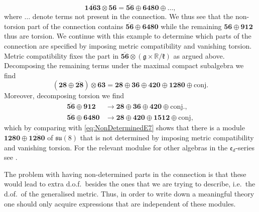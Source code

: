 \begin{equation}
    \overbar{\mathbf{1463}}\otimes\mathbf{56} = \overbar{\mathbf{56}}\oplus\mathbf{6480}\oplus\ldots,
\end{equation}
where $\ldots$ denote terms not present in the connection. We thus see that the non-torsion part of the connection contains $\overbar{\mathbf{56}}\oplus \mathbf{6480}$ while the remaining $\mathbf{56}\oplus\mathbf{912}$ thus are torsion. We continue with this example to determine which parts of the connection are specified by imposing metric compatibility and vanishing torsion. Metric compatibility fixes the part in $\overbar{\mathbf{56}}\otimes(\mathfrak{g}\times\mathbb{R}/\mathfrak{k})$ as argued above. Decomposing the remaining terms under the maximal compact subalgebra we find 
\begin{equation}\label{eq:NonDeterminedE7}
    \left(\mathbf{28}\oplus\overbar{\mathbf{28}}\right)\otimes\mathbf{63} = \mathbf{28}\oplus\mathbf{36}\oplus\mathbf{420}\oplus\mathbf{1280}\oplus \text{conj.}
\end{equation}
Moreover, decomposing torsion we find  
\begin{equation}
    \begin{aligned}
        \overbar{\mathbf{56}}\oplus\mathbf{912}&\to \mathbf{28}\oplus\mathbf{36}\oplus\mathbf{420}\oplus\text{conj.},\\
        \overbar{\mathbf{56}}\oplus\mathbf{6480}&\to\mathbf{28}\oplus\mathbf{420}\oplus\mathbf{1512}\oplus\text{conj},
    \end{aligned}
\end{equation}
which by comparing with \eqref{eq:NonDeterminedE7} shows that there is a module $\mathbf{1280}\oplus\overbar{\mathbf{1280}}$ of $\mathfrak{su}(8)$ that is not determined by imposing metric compatibility and vanishing torsion. For the relevant modulse for other algebras in the $\mathfrak{e}_{d}$-series see \cite{Cederwall:2013naa}. 

The problem with having non-determined parts in the connection is that these would lead to extra d.o.f.\ besides the ones that we are trying to describe, i.e.\ the d.of.\ of the generalised metric. Thus, in order to write down a meaningful theory one should only acquire expressions that are independent of these modules.





